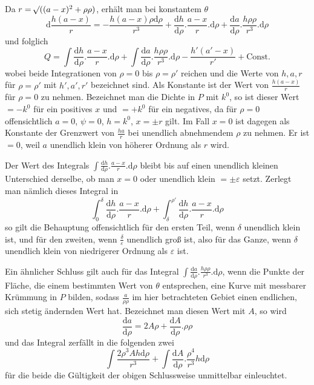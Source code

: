 Da $r=\mathord{{}^{}\!\surd}((a-x)^2+\rho\rho)$, erhält man bei konstantem $\theta$
\[
\mathrm{d}\frac{h(a-x)}{r}=-\frac{h(a-x)\rho\mathrm{d}\rho}{r^3}+\frac{\mathrm{d}h}{\mathrm{d}\rho}.\frac{a-x}{r}.\mathrm{d}\rho+\frac{\mathrm{d}a}{\mathrm{d}\rho}.\frac{h\rho\rho}{r^3}.\mathrm{d}\rho
\]
und folglich
\[
Q=\int\frac{\mathrm{d}h}{\mathrm{d}\rho}.\frac{a-x}{r}.\mathrm{d}\rho+\int\frac{\mathrm{d}a}{\mathrm{d}\rho}.\frac{h\rho\rho}{r^3}.\mathrm{d}\rho-\frac{h'(a'-x)}{r'}+\text{Const.}
\]
wobei beide Integrationen von $\rho=0$ bis $\rho=\rho'$ reichen und die Werte
%
von $h,a,r$ für $\rho=\rho'$ mit $h',a',r'$ bezeichnet sind. Als Konstante ist der Wert von $\frac{h(a-x)}{r}$ für $\rho=0$ zu nehmen. Bezeichnet man die Dichte in $P$ mit $k^0$, so ist dieser Wert $=-k^0$ für ein positives $x$ und $=+k^0$ für ein negatives, da für $\rho=0$ offensichtlich $a=0$, $\psi=0$, $h=k^0$, $x=\pm r$ gilt. Im Fall $x=0$ ist dagegen als Konstante der Grenzwert von $\frac{ha}{r}$ bei unendlich abnehmendem $\rho$ zu nehmen. Er ist $=0$, weil $a$ unendlich klein von höherer Ordnung als $r$ wird.

Der Wert des Integrals $\int\frac{\mathrm dh}{\mathrm d\rho}.\frac{a-x}{r}.\mathrm d\rho$ bleibt bis auf einen unendlich kleinen Unterschied derselbe, ob man $x=0$ oder unendlich klein $=\pm\varepsilon$ setzt. Zerlegt man nämlich dieses Integral in
\[
\int_0^\delta\frac{\mathrm dh}{\mathrm d\rho}.\frac{a-x}{r}.\mathrm d\rho+\int_\delta^{\rho'}\frac{\mathrm dh}{\mathrm d\rho}.\frac{a-x}{r}.\mathrm d\rho
\]
so gilt die Behauptung offensichtlich für den ersten Teil, wenn $\delta$ unendlich klein ist, und für den zweiten, wenn $\frac{\delta}{\varepsilon}$ unendlich groß ist, also für das Ganze, wenn $\delta$ unendlich klein von niedrigerer Ordnung als $\varepsilon$ ist.

Ein ähnlicher Schluss gilt auch für das Integral $\int\frac{\mathrm da}{\mathrm d\rho}.\frac{h\rho\rho}{r^3}.\mathrm d\rho$, wenn die Punkte der Fläche, die einem bestimmten Wert von $\theta$ entsprechen, eine Kurve mit messbarer Krümmung in $P$ bilden, sodass $\frac{a}{\rho\rho}$ im hier betrachteten Gebiet einen endlichen, sich stetig ändernden Wert hat. Bezeichnet man diesen Wert mit $A$, so wird
\[
\frac{\mathrm da}{\mathrm d\rho}=2A\rho+\frac{\mathrm dA}{\mathrm d\rho}.\rho\rho
\]
und das Integral zerfällt in die folgenden zwei
\[
\int\frac{2\rho^3Ah\mathrm d\rho}{r^3}+\int\frac{\mathrm dA}{\mathrm d\rho}.\frac{\rho^4}{r^3}h\mathrm d\rho
\]
für die beide die Gültigkeit der obigen Schlussweise unmittelbar einleuchtet.

